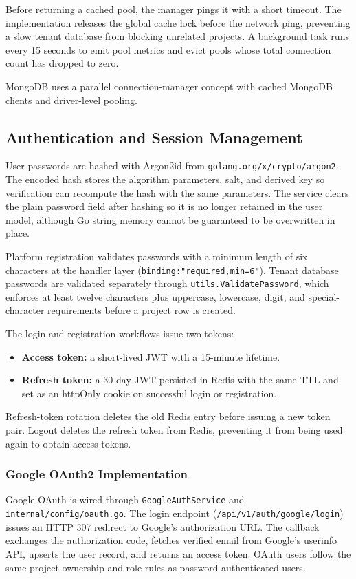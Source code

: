 Before returning a cached pool, the manager pings it with a short timeout. The implementation releases the global cache lock before the network ping, preventing a slow tenant database from blocking unrelated projects. A background task runs every 15 seconds to emit pool metrics and evict pools whose total connection count has dropped to zero.

MongoDB uses a parallel connection-manager concept with cached MongoDB clients and driver-level pooling.

\subsection{Authentication and Session Management}

User passwords are hashed with Argon2id from \texttt{golang.org/x/crypto/argon2}. The encoded hash stores the algorithm parameters, salt, and derived key so verification can recompute the hash with the same parameters. The service clears the plain password field after hashing so it is no longer retained in the user model, although Go string memory cannot be guaranteed to be overwritten in place.

Platform registration validates passwords with a minimum length of six characters at the handler layer (\texttt{binding:"required,min=6"}). Tenant database passwords are validated separately through \texttt{utils.ValidatePassword}, which enforces at least twelve characters plus uppercase, lowercase, digit, and special-character requirements before a project row is created.

The login and registration workflows issue two tokens:

\begin{itemize}
    \item \textbf{Access token:} a short-lived JWT with a 15-minute lifetime.
    \item \textbf{Refresh token:} a 30-day JWT persisted in Redis with the same TTL and set as an httpOnly cookie on successful login or registration.
\end{itemize}

Refresh-token rotation deletes the old Redis entry before issuing a new token pair. Logout deletes the refresh token from Redis, preventing it from being used again to obtain access tokens.

\subsubsection{Google OAuth2 Implementation}
Google OAuth is wired through \texttt{GoogleAuthService} and \texttt{internal/config/oauth.go}. The login endpoint (\texttt{/api/v1/auth/google/login}) issues an HTTP 307 redirect to Google's authorization URL. The callback exchanges the authorization code, fetches verified email from Google's userinfo API, upserts the user record, and returns an access token. OAuth users follow the same project ownership and role rules as password-authenticated users.

